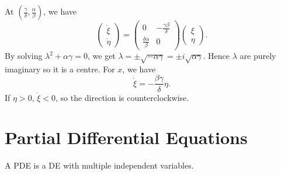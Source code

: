\documentclass[a4paper]{article}
\begin{document}
\begin{example}
        At $ (\frac{\gamma}{\delta},\frac{\alpha}{\beta}) $, we have 
        \[
            \begin{pmatrix}
                \dot{\xi}\\\dot{\eta}
            \end{pmatrix} = \begin{pmatrix}
                0&-\frac{\gamma \beta}{\delta}\\
                \frac{\delta \alpha}{\beta}&0
            \end{pmatrix}\begin{pmatrix}
                \xi\\\eta
            \end{pmatrix}.
        \]
        By solving $ \lambda^2+\alpha \gamma=0 $, we get $ \lambda=\pm \sqrt{-\alpha\gamma}=\pm i \sqrt{\alpha\gamma} $. Hence $ \lambda $ are purely imaginary so it is a centre. For $x$, we have 
        \[
            \dot{\xi}=-\frac{\beta \gamma}{\delta}\eta.
        \]
        If $ \eta>0 $, $ \dot{\xi}<0 $, so the direction is counterclockwise.
    \end{example}
    \section{Partial Differential Equations}
    \begin{definition}
        A PDE is a DE with multiple independent variables.
    \end{definition}
\end{document}
